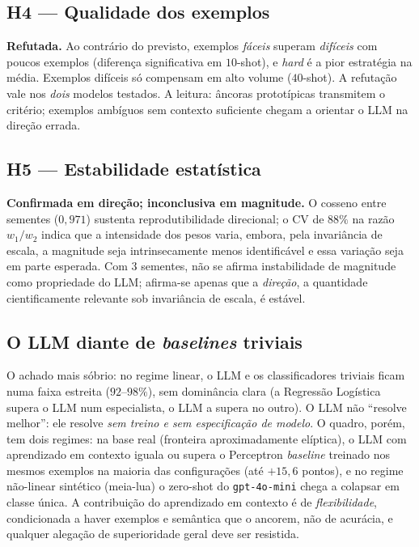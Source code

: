 \documentclass[12pt,a4paper]{article}
\begin{document}
\subsection{H4 — Qualidade dos exemplos}
\textbf{Refutada.} Ao contrário do previsto, exemplos \emph{fáceis} superam \emph{difíceis}
com poucos exemplos (diferença significativa em $10$-shot), e \emph{hard} é a pior
estratégia na média. Exemplos difíceis só compensam em alto volume ($40$-shot). A refutação
vale nos \emph{dois} modelos testados. A leitura: âncoras prototípicas transmitem o critério;
exemplos ambíguos sem contexto suficiente chegam a orientar o LLM na direção errada.

\subsection{H5 — Estabilidade estatística}
\textbf{Confirmada em direção; inconclusiva em magnitude.} O cosseno entre sementes
($0{,}971$) sustenta reprodutibilidade direcional; o CV de $88\%$ na razão $w_1/w_2$ indica
que a intensidade dos pesos varia, embora, pela invariância de escala, a magnitude seja
intrinsecamente menos identificável e essa variação seja em parte esperada. Com $3$ sementes,
não se afirma instabilidade de magnitude como propriedade do LLM; afirma-se apenas que a
\emph{direção}, a quantidade cientificamente relevante sob invariância de escala, é estável.

\subsection{O LLM diante de \emph{baselines} triviais}
O achado mais sóbrio: no regime linear, o LLM e os classificadores triviais ficam numa
faixa estreita ($92$–$98\%$), sem dominância clara (a Regressão Logística supera o LLM num
especialista, o LLM a supera no outro). O LLM não ``resolve melhor'': ele resolve \emph{sem
treino e sem especificação de modelo}. O quadro, porém, tem dois regimes: na base real
(fronteira aproximadamente elíptica), o LLM com aprendizado em contexto iguala ou supera o Perceptron
\emph{baseline} treinado nos mesmos exemplos na maioria das configurações (até $+15{,}6$
pontos), e no regime não-linear sintético (meia-lua) o zero-shot do \texttt{gpt-4o-mini}
chega a colapsar em classe única. A contribuição do aprendizado em contexto é de
\emph{flexibilidade},
condicionada a haver exemplos e semântica que o ancorem, não de acurácia, e qualquer
alegação de superioridade geral deve ser resistida.
\end{document}
